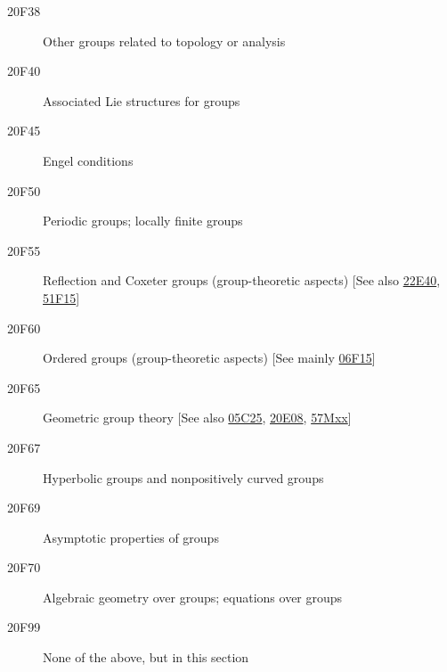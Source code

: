 \documentclass[letterpaper]{article}
\begin{document}
\begin{description}
\item [20F38]\label{20F38} Other groups related to topology or analysis
\item [20F40]\label{20F40} Associated Lie structures for groups
\item [20F45]\label{20F45} Engel conditions
\item [20F50]\label{20F50} Periodic groups; locally finite groups
\item [20F55]\label{20F55} Reflection and Coxeter groups (group-theoretic aspects) [See also \hyperref[22E40]{22E40}, \hyperref[51F15]{51F15}]
\item [20F60]\label{20F60} Ordered groups (group-theoretic aspects) [See mainly \hyperref[06F15]{06F15}]
\item [20F65]\label{20F65} Geometric group theory [See also \hyperref[05C25]{05C25}, \hyperref[20E08]{20E08}, \hyperref[57Mxx]{57Mxx}]
\item [20F67]\label{20F67} Hyperbolic groups and nonpositively curved groups
\item [20F69]\label{20F69} Asymptotic properties of groups
\item [20F70]\label{20F70} Algebraic geometry over groups; equations over groups
\item [20F99]\label{20F99} None of the above, but in this section
\end{description}
\end{document}
